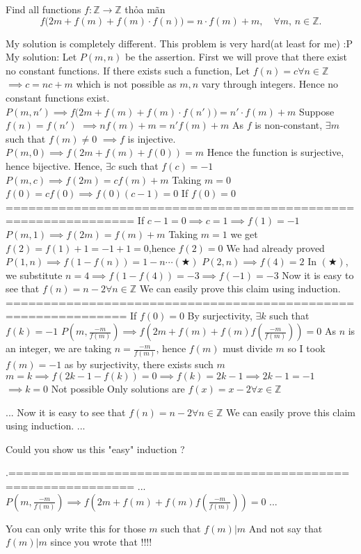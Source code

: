 \begin{solution}
	\begin{tcolorbox}Find all functions $f:\mathbb Z \to \mathbb Z$ thỏa mãn \[f\big(2m+f(m)+f(m)\cdot f(n)\big)=n\cdot f(m)+m,\quad\forall m,\,n \in \mathbb Z.\]\end{tcolorbox}
My solution is completely different.
This problem is very hard(at least for me) :P
My solution:
Let $P(m,n)$ be the assertion.
First we will prove that there exist no constant functions.
If there exists such a function,
Let $f(n)=c\forall n\in \mathbb{Z}$
$\implies c=nc+m$ which is not possible as $m,n$ vary through integers.
Hence no constant functions exist.
$P(m,n')\implies f\big(2m+f(m)+f(m)\cdot f(n')\big)=n'\cdot f(m)+m$
Suppose $f(n)=f(n')$
$\implies nf(m)+m=n'f(m)+m$
As $f$ is non-constant, $\exists m$ such that $f(m)\neq 0$
$\implies f$ is injective.
$P(m,0)\implies f(2m+f(m)+f(0))=m$
Hence the function is surjective, hence bijective.
Hence, $\exists c$ such that $f(c)=-1$
$P(m,c)\implies f(2m)=cf(m)+m$
Taking $m=0$
$f(0)=cf(0)\implies f(0)(c-1)=0$
If $f(0)=0$
===============================================================
If $c-1=0\implies c=1\implies f(1)=-1$
$P(m,1)\implies f(2m)=f(m)+m$
Taking $m=1$ we get $f(2)=f(1)+1=-1+1=0$,hence $f(2)=0$
We had already proved
$P(1,n)\implies f(1-f(n))=1-n\cdots(\bigstar)$
$P(2,n)\implies f(4)=2$
In $(\bigstar)$, we substitute $n=4\implies f(1-f(4))=-3\implies f(-1)=-3$
Now it is easy to see that $f(n)=n-2\forall n\in\mathbb{Z}$
We can easily prove this claim using induction.
==============================================================
If $f(0)=0$
By surjectivity,
$\exists k$ such that $f(k)=-1$
$P\left(m,\frac{-m}{f(m)}\right)\implies f\left(2m+f(m)+f(m)f\left(\frac{-m}{f(m)}\right)\right)=0$
As $n$ is an integer, we are taking $n=\frac{-m}{f(m)}$, hence $f(m)$ must divide $m$ so I took $f(m)=-1$ as by surjectivity, there exists such $m$
$m=k\implies f(2k-1-f(k))=0\implies f(k)=2k-1\implies 2k-1=-1$
$\implies k=0$
Not possible
Only solutions are $f(x)=x-2\forall x\in\mathbb{Z}$
\end{solution}



\begin{solution}
	\begin{tcolorbox}...
Now it is easy to see that $f(n)=n-2\forall n\in\mathbb{Z}$
We can easily prove this claim using induction.
...
\end{tcolorbox}
Could you show us this "easy" induction ?

\begin{tcolorbox}.==============================================================
...
$P\left(m,\frac{-m}{f(m)}\right)\implies f\left(2m+f(m)+f(m)f\left(\frac{-m}{f(m)}\right)\right)=0$
...
\end{tcolorbox}
You can only write this for those $m$ such that $f(m)|m$
And not say that $f(m)|m$ since you wrote that !!!!
\end{solution}



